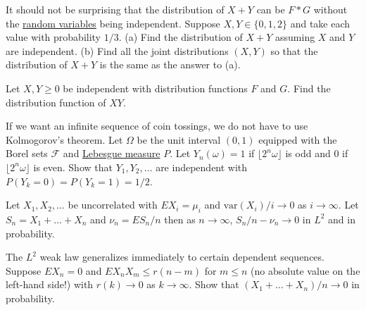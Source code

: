   \begin{exercise}[Durrett 2.1.13]
    It should not be surprising that the distribution of $X + Y$ can be $F * G$ without the \hyperref[def:random-variable]{random variables} being independent. Suppose $X, Y \in \{0, 1, 2\}$ and take each value with probability $1/3$. (a) Find the distribution of $X + Y$ assuming $X$ and $Y$ are independent. (b) Find all the joint distributions $(X, Y)$ so that the distribution of $X + Y$ is the same as the answer to (a).
  \end{exercise}
  \begin{solution}

  \end{solution}

  \begin{exercise}[Durrett 2.1.14]
    Let $X, Y \geq 0$ be independent with distribution functions $F$ and $G$. Find the distribution function of $XY$.
  \end{exercise}
  \begin{solution}

  \end{solution}

  \begin{exercise}[Durrett 2.1.15]
    If we want an infinite sequence of coin tossings, we do not have to use Kolmogorov's theorem. Let $\Omega$ be the unit interval $(0, 1)$ equipped with the Borel sets $\mathcal{F}$ and \hyperref[mt-def:lebesgue-measure]{Lebesgue measure} $P$. Let $Y_n(\omega) = 1$ if $\lfloor 2^n \omega \rfloor$ is odd and $0$ if $\lfloor 2^n \omega \rfloor$ is even. Show that $Y_1, Y_2, \dots$ are independent with $P(Y_k = 0) = P(Y_k = 1) = 1/2$.
  \end{exercise}
  \begin{solution}

  \end{solution}

  \begin{exercise}[Durrett 2.2.1]
    Let $X_1, X_2, \dots$ be uncorrelated with $EX_i = \mu_i$ and $\text{var}(X_i)/i \to 0$ as $i \to \infty$. Let $S_n = X_1 + \dots + X_n$ and $\nu_n = ES_n/n$ then as $n \to \infty$, $S_n/n - \nu_n \to 0$ in $L^2$ and in probability.
  \end{exercise}
  \begin{solution}

  \end{solution}

  \begin{exercise}[Durrett 2.2.2]
    The $L^2$ weak law generalizes immediately to certain dependent sequences. Suppose $EX_n = 0$ and $EX_n X_m \leq r(n - m)$ for $m \leq n$ (no absolute value on the left-hand side!) with $r(k) \to 0$ as $k \to \infty$. Show that $(X_1 + \dots + X_n)/n \to 0$ in probability.
  \end{exercise}
  \begin{solution}

  \end{solution}

